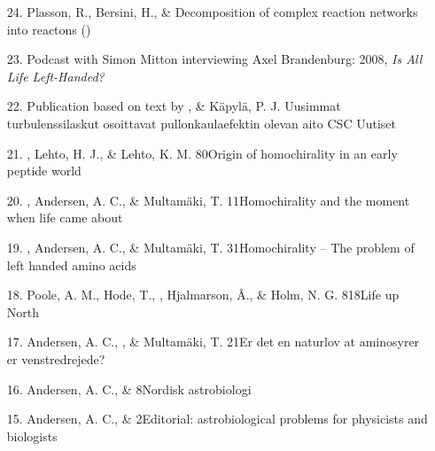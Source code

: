 \begin{itemize}
\item[24.]
Plasson, R., Bersini, H., \& \Brandenburg{}
{Decomposition of complex reaction networks into reactons}
()

\item[23.]
Podcast with Simon Mitton interviewing Axel Brandenburg: 2008,
{\it Is All Life Left-Handed?}

\item[22.]
Publication based on text by \Brandenburg, \& K\"apyl\"a, P. J.
{Uusimmat turbulenssilaskut osoittavat pullonkaulaefektin olevan aito}
{CSC Uutiset}

\item[21.]
\Brandenburg, Lehto, H. J., \& Lehto, K. M.
{80}{Origin of homochirality in an early peptide world}

\item[20.]
\Brandenburg, Andersen, A. C., \& Multam\"aki, T.
{11}{Homochirality and the moment when life came about}

\item[19.]
\Brandenburg, Andersen, A. C., \& Multam\"aki, T.
{31}{Homochirality -- The problem of left handed amino acids}

\item[18.]
Poole, A. M., Hode, T., \Brandenburg, Hjalmarson, \AA.,
\& Holm, N. G.
{818}{Life up North}

\item[17.]
Andersen, A. C., \Brandenburg,
\& Multam\"aki, T.
{21}{Er det en naturlov at aminosyrer er venstredrejede?}

\item[16.]
Andersen, A. C., \& \Brandenburg{}
{8}{Nordisk astrobiologi}

\item[15.]
Andersen, A. C., \& \Brandenburg{}
{2}{Editorial: astrobiological problems for physicists and biologists}


\end{itemize}
